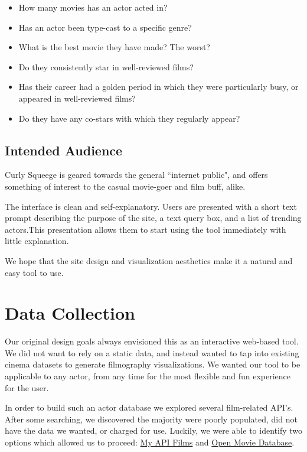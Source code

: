 \documentclass[12pt]{article}
\begin{document}
	\begin{itemize}
		\item How many movies has an actor acted in?
		\item Has an actor been type-cast to a specific genre?
		\item What is the best movie they have made? The worst?
		\item Do they consistently star in well-reviewed films?
		\item Has their career had a golden period in which they were particularly busy, or appeared in well-reviewed films?
		\item Do they have any co-stars with which they regularly appear?
	\end{itemize}
	
\subsection{Intended Audience}
Curly Squeege is geared towards the general ``internet public", and offers something of interest to the casual movie-goer  and film buff, alike.  

The interface is clean and self-explanatory.  
Users are presented with a short text prompt describing the purpose of the site, a text query box, and a list of trending actors.This presentation allows them to start using the tool immediately with little explanation.

We hope that the site design and visualization aesthetics make it a natural and easy tool to use.
\newpage 

\section{Data Collection}

Our original design goals always envisioned this as an interactive web-based tool.  We did not want to rely on a static data, and instead wanted to tap into existing cinema datasets to generate filmography visualizations.  We wanted our tool to be applicable to any actor, from any time for the most flexible and fun experience for the user. 

	In order to build such an actor database we explored several film-related API's.  After some searching, we discovered the majority were poorly populated, did not have the data we wanted, or charged for use.  Luckily, we were able to identify two options which allowed us to proceed: \href{http://api.myapifilms.com/index.do}{My API Films} and \href{http://www.omdbapi.com/}{Open Movie Database}. 
	
\end{document}
